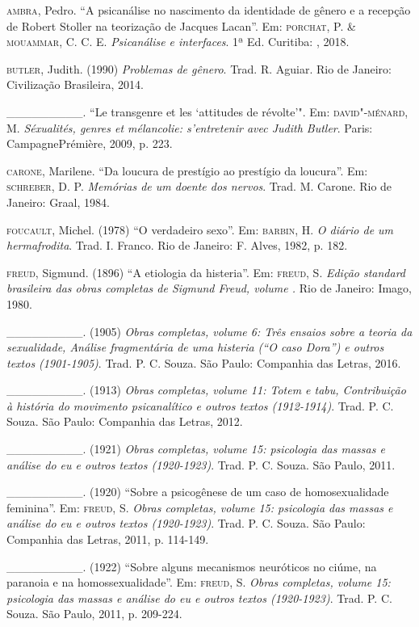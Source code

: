 \begin{Parskip}
\textsc{ambra}, Pedro. ``A psicanálise no nascimento da identidade de gênero e a
recepção de Robert Stoller na teorização de Jacques Lacan''. Em: \textsc{porchat},
P. \& \textsc{mouammar}, C. C. E. \emph{Psicanálise e interfaces}. 1ª Ed.
Curitiba: , 2018.

\textsc{butler}, Judith. (1990) \emph{Problemas de gênero}. Trad. R. Aguiar.
Rio de Janeiro: Civilização Brasileira, 2014. 

\_\_\_\_\_\_\_\_\_. ``Le transgenre et les `attitudes de révolte'". Em: \textsc{david"-ménard}, M. \emph{Séxualités, genres et mélancolie: s'entretenir avec
Judith Butler}. Paris: CampagnePrémière, 2009, p. 223.

\textsc{carone}, Marilene. ``Da loucura de prestígio ao prestígio da loucura''. Em:
\textsc{schreber}, D. P. \emph{Memórias de um doente dos nervos}. Trad. M. Carone.
Rio de Janeiro: Graal, 1984.

\textsc{foucault}, Michel. (1978) ``O verdadeiro sexo''. Em: \textsc{barbin}, H. \emph{O
diário de um hermafrodita}. Trad. I. Franco. Rio de Janeiro: F. Alves, 1982, p. 182.

\textsc{freud}, Sigmund. (1896) ``A etiologia da histeria''. Em: \textsc{freud}, S.
\emph{Edição standard brasileira das obras completas de Sigmund Freud,
volume .} Rio de Janeiro: Imago, 1980.

\_\_\_\_\_\_\_\_\_. (1905) \emph{Obras completas, volume 6: Três ensaios
sobre a teoria da sexualidade, Análise fragmentária de uma histeria (``O
caso Dora'') e outros textos (1901-1905)}. Trad. P. C. Souza. São Paulo: Companhia das Letras, 2016.  

\_\_\_\_\_\_\_\_\_. (1913) \emph{Obras completas,
volume 11: Totem e tabu, Contribuição à história do movimento
psicanalítico e outros textos (1912-1914)}. Trad. P. C. Souza. São Paulo: Companhia das Letras, 2012.

\_\_\_\_\_\_\_\_\_. (1921) \emph{Obras completas, volume 15: psicologia das massas e análise
do eu e outros textos (1920-1923)}. Trad. P. C. Souza. São Paulo, 2011. 

\_\_\_\_\_\_\_\_\_. (1920) ``Sobre a psicogênese de um caso de homosexualidade
feminina''. Em: \textsc{freud}, S. \emph{Obras completas, volume 15: psicologia das
massas e análise do eu e outros textos (1920-1923)}. Trad. P. C. Souza.
São Paulo: Companhia das Letras, 2011, p. 114-149. 

\_\_\_\_\_\_\_\_\_. (1922) ``Sobre alguns mecanismos neuróticos no ciúme, na
paranoia e na homossexualidade''. Em: \textsc{freud}, S. \emph{Obras completas,
volume 15: psicologia das massas e análise do eu e outros textos
(1920-1923)}. Trad. P. C. Souza. São Paulo, 2011, p. 209-224.


\end{Parskip}
